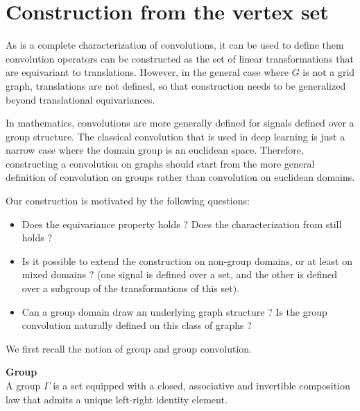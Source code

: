 \section{Construction from the vertex set}


As  is a complete characterization of convolutions, it can be used to define them \ie convolution operators can be constructed as the set of linear transformations that are equivariant to translations. However, in the general case where $G$ is not a grid graph, translations are not defined, so that construction needs to be generalized beyond translational equivariances.

In mathematics, convolutions are more generally defined for signals defined over a group structure. The classical convolution that is used in deep learning is just a narrow case where the domain group is an euclidean space. Therefore, constructing a convolution on graphs should start from the more general definition of convolution on groups rather than convolution on euclidean domains.

Our construction is motivated by the following questions:
\begin{itemize}
\item Does the equivariance property holds ? Does the characterization from  still holds ?
\item Is it possible to extend the construction on non-group domains, or at least on mixed domains ? (\ie one signal is defined over a set, and the other is defined over a subgroup of the transformations of this set).
\item Can a group domain draw an underlying graph structure ? Is the group convolution naturally defined on this class of graphs ?
\end{itemize}


We first recall the notion of group and group convolution.

\begin{definition}\textbf{Group}\\
A group $\Gamma$ is a set equipped with a closed, associative and invertible composition law that admits a unique left-right identity element.
\end{definition}

